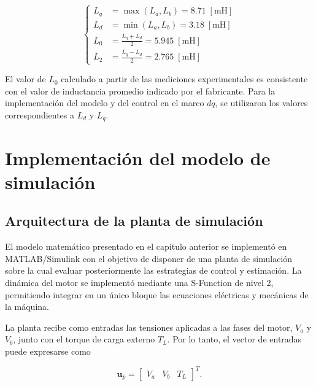 \begin{equation}
\label{eq:calculo_inductancia}
\left\{
\begin{aligned}
    L_q &= \max(L_a,L_b)
        = 8.71\;[\mathrm{mH}]
        \\
    L_d &= \min(L_a,L_b)
        = 3.18\;[\mathrm{mH}]
        \\
    L_0 &= \frac{L_q+L_d}{2}
        = 5.945\;[\mathrm{mH}]
        \\
    L_2 &= \frac{L_q-L_d}{2}
        = 2.765\;[\mathrm{mH}]
\end{aligned}
\right.
\end{equation}


El valor de $L_0$ calculado a partir de las mediciones experimentales es
consistente con el valor de inductancia promedio indicado por el
fabricante. Para la implementación del modelo y del control en el marco
$dq$, se utilizaron los valores correspondientes a $L_d$ y $L_q$.



\section{Implementación del modelo de simulación}


\subsection{Arquitectura de la planta de simulación}
\label{subsec:arquitectura_planta}

El modelo matemático presentado en el capítulo anterior se implementó
en MATLAB/Simulink con el objetivo de disponer de una planta de
simulación sobre la cual evaluar posteriormente las estrategias de
control y estimación. La dinámica del motor se implementó mediante una
S-Function de nivel 2, permitiendo integrar en un único bloque las
ecuaciones eléctricas y mecánicas de la máquina.

La planta recibe como entradas las tensiones aplicadas a las fases
del motor, $V_a$ y $V_b$, junto con el torque de carga externo $T_L$.
Por lo tanto, el vector de entradas puede expresarse como

\begin{equation}
    \mathbf{u}_p =
    \begin{bmatrix}
        V_a &
        V_b &
        T_L
    \end{bmatrix}^{T}.
    \label{eq:entradas_planta}
\end{equation}


